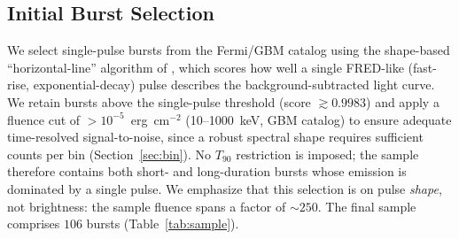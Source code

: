 \documentclass[twocolumn]{aastex631}
\begin{document}
\subsection{Initial Burst Selection} \label{sec:sel}
We select single-pulse bursts from the Fermi/GBM catalog
\citep{Meegan2009,Gruber2014} using the shape-based ``horizontal-line'' algorithm
of \citet{Busby2024}, which scores how well a single FRED-like (fast-rise,
exponential-decay) pulse describes the background-subtracted light curve. We retain bursts above the \citeauthor{Busby2024}
single-pulse threshold (score $\gtrsim0.9983$) and apply a fluence cut of
$>$$10^{-5}$~erg~cm$^{-2}$ (10--1000~keV, GBM catalog) to ensure adequate
time-resolved signal-to-noise, since a robust spectral shape requires
sufficient counts per bin (Section~\ref{sec:bin}). No $T_{90}$ restriction is
imposed; the sample therefore contains both short- and long-duration bursts whose
emission is dominated by a single pulse. We emphasize that this selection is on
pulse \emph{shape}, not brightness: the sample fluence spans a factor of
$\sim$$250$. The final sample comprises \textbf{$106$} bursts
(Table~\ref{tab:sample}).
\end{document}
